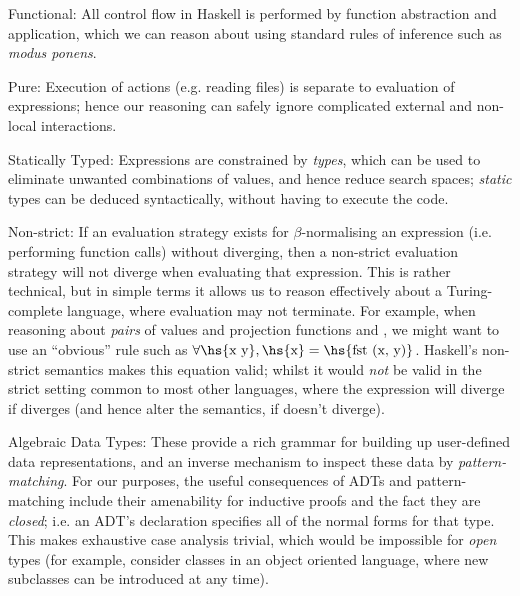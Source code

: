 \begin{description}

\item{Functional}: All control flow in Haskell is performed by function
  abstraction and application, which we can reason about using standard rules of
  inference such as \emph{modus ponens}.

\item{Pure}: Execution of actions (e.g. reading files) is separate to evaluation
  of expressions; hence our reasoning can safely ignore complicated external and
  non-local interactions.

\item{Statically Typed}: Expressions are constrained by \emph{types}, which can
  be used to eliminate unwanted combinations of values, and hence reduce search
  spaces; \emph{static} types can be deduced syntactically, without having to
  execute the code.

\item{Non-strict}: If an evaluation strategy exists for $\beta$-normalising an
  expression (i.e. performing function calls) without diverging, then a
  non-strict evaluation strategy will not diverge when evaluating that
  expression. This is rather technical, but in simple terms it allows us to
  reason effectively about a Turing-complete language, where evaluation may not
  terminate. For example, when reasoning about \emph{pairs} of values  and projection functions  and , we might want to use an
  ``obvious'' rule such as
  $\forall \text{\hs{x y}}, \text{\hs{x}} = \text{\hs{fst (x, y)}}$. Haskell's
  non-strict semantics makes this equation valid; whilst it would \emph{not} be
  valid in the strict setting common to most other languages, where the
  expression  will diverge if  diverges (and hence alter
  the semantics, if  doesn't diverge).

\item{Algebraic Data Types}: These provide a rich grammar for building up
  user-defined data representations, and an inverse mechanism to inspect these
  data by \emph{pattern-matching}. For our purposes, the useful consequences of
  ADTs and pattern-matching include their amenability for inductive proofs and
  the fact they are \emph{closed}; i.e. an ADT's declaration specifies all of
  the normal forms for that type. This makes exhaustive case analysis trivial,
  which would be impossible for \emph{open} types (for example, consider classes
  in an object oriented language, where new subclasses can be introduced at any
  time).


\end{description}
